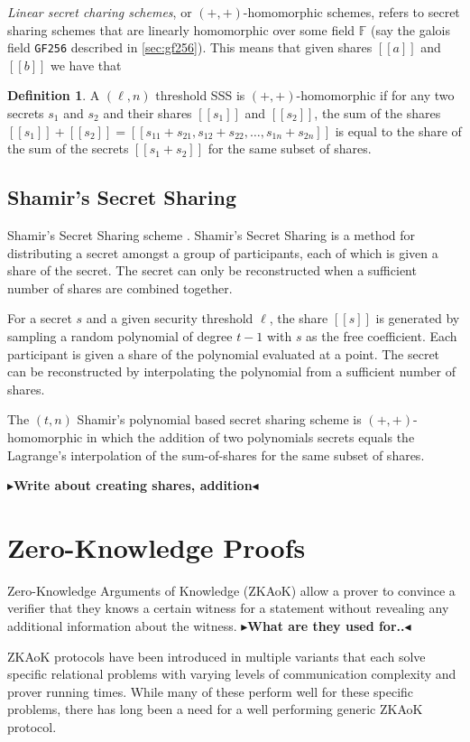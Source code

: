 \documentclass[twoside,11pt,openright]{report}
\theoremstyle{definition}
\newtheorem{definition}{Definition}[section]
\theoremstyle{plain}
\newcommand{\todo}[1]{{\color[rgb]{.5,0,0}\textbf{$\blacktriangleright$#1$\blacktriangleleft$}}}
\begin{document}
\textit{Linear secret charing schemes}, or $(+,+)$-homomorphic schemes, refers to secret sharing schemes that are linearly homomorphic over some field $\mathbb{F}$ (say the galois field \texttt{GF256} described in \autoref{sec:gf256}). This means that given shares $[[a]]$ and $[[b]]$ we have that
\begin{definition}
  A $(\ell,n)$ threshold SSS is $(+,+)$-homomorphic if for any two secrets $s_1$ and $s_2$ and their shares $[[s_1]]$ and $[[s_2]]$, the sum of the shares $[[s_1]] + [[s_2]] = [[s_{11} + s_{21}, s_{12} + s_{22}, \dots, s_{1n} + s_{2n}]]$ is equal to the share of the sum of the secrets $[[s_1 + s_2]]$ for the same subset of shares.
\end{definition}
\subsection{Shamir's Secret Sharing}
\label{sec:shamir}

Shamir's Secret Sharing scheme \cite{shamir1979share}. Shamir's Secret Sharing is a method for distributing a secret amongst a group of participants, each of which is given a share of the secret. The secret can only be reconstructed when a sufficient number of shares are combined together.

For a secret $s$ and a given security threshold $\ell$, the share $[[s]]$ is generated by sampling a random polynomial of degree $t-1$ with $s$ as the free coefficient. Each participant is given a share of the polynomial evaluated at a point. The secret can be reconstructed by interpolating the polynomial from a sufficient number of shares.

The $(t,n)$ Shamir's polynomial based secret sharing scheme is $(+,+)$-homomorphic in which the addition of two polynomials secrets equals the Lagrange's interpolation of the sum-of-shares for the same subset of shares.

\todo{Write about creating shares, addition}

\section{Zero-Knowledge Proofs}
\label{sec:zkp}

Zero-Knowledge Arguments of Knowledge (ZKAoK) allow a prover to convince a verifier that they knows a certain witness for a statement without revealing any additional information about the witness. \todo{What are they used for..}

ZKAoK protocols have been introduced in multiple variants that each solve specific relational problems with varying levels of communication complexity and prover running times. While many of these perform well for these specific problems, there has long been a need for a well performing generic ZKAoK protocol.
\end{document}
